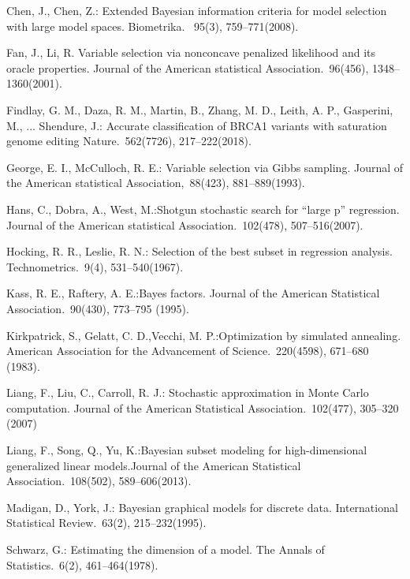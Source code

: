 \documentclass[twocolumn]{svjour3}       %
\newcommand{\0}{\boldsymbol 0} %
\newcommand{\1}{\boldsymbol 1} %
\begin{document}
{\begin{thebibliography}{00}
Chen, J., Chen, Z.: Extended Bayesian information criteria for model selection with large model spaces. Biometrika. ~{95(3)}, 759--771(2008).

Fan, J., Li, R. 
Variable selection via nonconcave penalized likelihood and its oracle properties.
Journal of the American statistical Association.~{96(456)}, 1348--1360(2001).

Findlay, G. M., Daza, R. M., Martin, B., Zhang, M. D., Leith, A. P., Gasperini, M., ... Shendure, J.: Accurate classification of BRCA1 variants with saturation genome editing
Nature.~{562(7726)}, 217--222(2018).

George, E. I., McCulloch, R. E.: Variable selection via Gibbs sampling. Journal of the American statistical Association,~{88(423)}, 881--889(1993).

Hans, C., Dobra, A., West, M.:Shotgun stochastic search for ``large p'' regression. 
Journal of the American statistical Association.~{102(478)}, 507--516(2007).

Hocking, R. R., Leslie, R. N.: Selection of the best subset in regression analysis. 
Technometrics.~{9(4)}, 531--540(1967). 

Kass, R. E., Raftery, A. E.:Bayes factors. Journal of the American Statistical Association.~{90(430)}, 773--795 (1995). 

Kirkpatrick, S., Gelatt, C. D.,Vecchi, M. P.:Optimization by simulated annealing. 
American Association for the Advancement of Science.~{220(4598)}, 671--680 (1983). 

Liang, F., Liu, C., Carroll, R. J.:
Stochastic approximation in Monte Carlo computation. 
Journal of the American Statistical Association.~{102(477)}, 305--320 (2007)

Liang, F., Song, Q., Yu, K.:Bayesian subset modeling for high-dimensional generalized linear models.Journal of the American Statistical Association.~{108(502)}, 589--606(2013).

Madigan, D., York, J.:
Bayesian graphical models for discrete data. 
International Statistical Review.~{63(2)}, 215--232(1995). 

Schwarz, G.: 
Estimating the dimension of a model. 
The Annals of Statistics.~{6(2)}, 461--464(1978). 


\end{thebibliography}}
\end{document}
